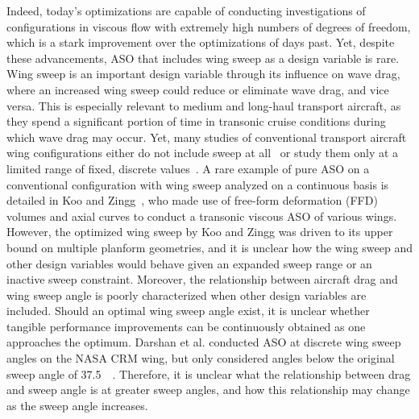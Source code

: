 Indeed, today's optimizations are capable of conducting investigations of configurations in viscous flow with extremely high numbers of degrees of freedom, which is a stark improvement over the optimizations of days past.
Yet, despite these advancements, ASO that includes wing sweep as a design variable is rare.
Wing sweep is an important design variable through its influence on wave drag, where an increased wing sweep could reduce or eliminate wave drag, and vice versa.
This is especially relevant to medium and long-haul transport aircraft, as they spend a significant portion of time in transonic cruise conditions during which wave drag may occur.
Yet, many studies of conventional transport aircraft wing configurations either do not include sweep at all~\cite{jameson_optimum_1995, jameson_optimum_1998, nielsen_aerodynamic_1999, reuther_aerodynamic_1996, kenway_cad-free_2010, ledoux_study_2015, kenway_multipoint_2015, martins_high-fidelity_2017, chen_aerodynamic_2015, telidetzki_application_2014, lyu_rans-based_2014,  lyu_aerodynamic_2015, osusky_drag_2015, chen_aerodynamic_2016, meheut_gradient-based_2016, shi-dong_adjoint-based_2017, shi-dong_approximate_2018, yu_influence_2018, mangano_multipoint_2019, poole_objectives_2020} or study them only at a limited range of fixed, discrete values~\cite{darshan_aerodynamic_2021}.
A rare example of pure ASO on a conventional configuration with wing sweep analyzed on a continuous basis is detailed in Koo and Zingg~\cite{koo_investigation_2018}, who made use of free-form deformation (FFD) volumes and axial curves to conduct a transonic viscous ASO of various wings. However, the optimized wing sweep by Koo and Zingg was driven to its upper bound on multiple planform geometries, and it is unclear how the wing sweep and other design variables would behave given an expanded sweep range or an inactive sweep constraint. Moreover, the relationship between aircraft drag and wing sweep angle is poorly characterized when other design variables are included. Should an optimal wing sweep angle exist, it is unclear whether tangible performance improvements can be continuously obtained as one approaches the optimum. Darshan et al. conducted ASO at discrete wing sweep angles on the NASA CRM wing, but only considered angles below the original sweep angle of 37.5\degree\ ~\cite{darshan_aerodynamic_2021}. Therefore, it is unclear what the relationship between drag and sweep angle is at greater sweep angles, and how this relationship may change as the sweep angle increases.\par

